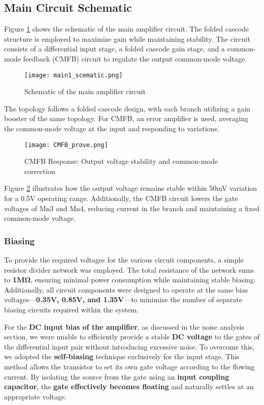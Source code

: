 \documentclass[a4paper,12pt]{article}
\begin{document}
\subsection{Main Circuit Schematic}
Figure \ref{fig:main_circuit} shows the schematic of the main amplifier circuit. The folded cascode structure is employed to maximize gain while maintaining stability. The circuit consists of a differential input stage, a folded cascode gain stage, and a common-mode feedback (CMFB) circuit to regulate the output common-mode voltage.

\begin{figure}[h]
    \centering
    \texttt{[image: main1\_scematic.png]}
    \caption{Schematic of the main amplifier circuit}
    \label{fig:main_circuit}
\end{figure}


The topology follows a folded cascode design, with each branch utilizing a gain booster of the same topology. For CMFB, an error amplifier is used, averaging the common-mode voltage at the input and responding to variations. 

\begin{figure}[H]
    \centering
    \texttt{[image: CMFB\_prove.png]}
    \caption{CMFB Response: Output voltage stability and common-mode correction}
    \label{fig:cmfb_response}
\end{figure}

Figure \ref{fig:cmfb_response} illustrates how the output voltage remains stable within 50mV variation for a 0.5V operating range. Additionally, the CMFB circuit lowers the gate voltages of Mn3 and Mn4, reducing current in the branch and maintaining a fixed common-mode voltage.
\subsubsection{Biasing}
To provide the required voltages for the various circuit components, a simple resistor divider network was employed. The total resistance of the network sums to \textbf{1MΩ}, ensuring minimal power consumption while maintaining stable biasing. Additionally, all circuit components were designed to operate at the same bias voltages—\textbf{0.35V, 0.85V, and 1.35V}—to minimize the number of separate biasing circuits required within the system.

For the \textbf{DC input bias of the amplifier}, as discussed in the noise analysis section, we were unable to efficiently provide a stable \textbf{DC voltage} to the gates of the differential input pair without introducing excessive noise. To overcome this, we adopted the \textbf{self-biasing} technique exclusively for the input stage. This method allows the transistor to set its own gate voltage according to the flowing current. By isolating the source from the gate using an \textbf{input coupling capacitor}, the \textbf{gate effectively becomes floating} and naturally settles at an appropriate voltage.
\end{document}
